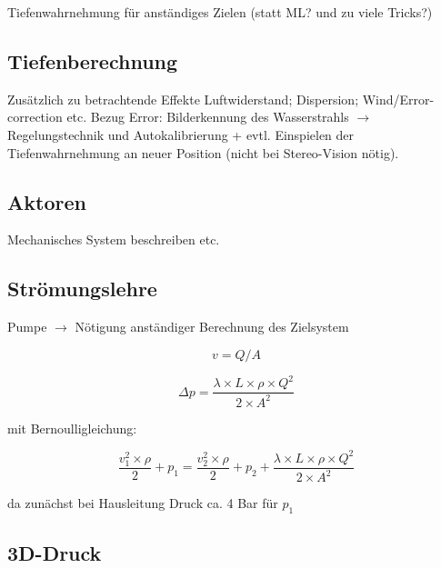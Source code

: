 Tiefenwahrnehmung für anständiges Zielen (statt ML? und zu viele Tricks?)

\subsection{Tiefenberechnung}

Zusätzlich zu betrachtende Effekte Luftwiderstand; Dispersion; Wind/Error-correction etc.
Bezug Error: Bilderkennung des Wasserstrahls $\rightarrow$ Regelungstechnik und Autokalibrierung
+ evtl. Einspielen der Tiefenwahrnehmung an neuer Position (nicht bei Stereo-Vision nötig).


\subsection{Aktoren}

Mechanisches System beschreiben etc.

\subsection{Strömungslehre}

Pumpe $\rightarrow$ Nötigung anständiger Berechnung des Zielsystem

\begin{equation} \label{v_qa}
    v = Q/A
\end{equation}

\begin{equation}\label{Rohreibung}
    \Delta p = \frac{\lambda \times L \times \rho \times Q^2}{2 \times A^2}
\end{equation}

mit Bernoulligleichung:

\begin{equation}
    \frac{v_{1}^2 \times \rho}{2} + p_1 = \frac{v_{2}^2 \times \rho}{2} + p_2 + \frac{\lambda \times L \times \rho \times Q^2}{2 \times A^2}
\end{equation}

da zunächst bei Hausleitung Druck ca. 4 Bar für $p_1$

\subsection{3D-Druck}

